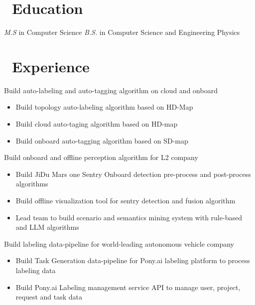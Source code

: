 \documentclass{resume}
\begin{document}



\section{\faGraduationCap\ Education}
\textit{M.S} in Computer Science
\textit{B.S.} in Computer Science and Engineering Physics

\section{\faUsers\ Experience}
Build auto-labeling and auto-tagging algorithm on cloud and onboard
\begin{itemize}
  \item Build topology auto-labeling algorithm based on HD-Map
  \item Build cloud auto-taging algorithm based on HD-map
  \item Build onboard auto-tagging algorithm based on SD-map
\end{itemize}

Build onboard and offline perception algorithm for L2 company
\begin{itemize}
  \item Build JiDu Mars one Sentry Onboard detection pre-process and post-process algorithms
  \item Build offline visualization tool for sentry detection and fusion algorithm
  \item Lead team to build scenario and semantics mining system with rule-based and LLM algorithms
\end{itemize}

Build labeling data-pipeline for world-leading autonomous vehicle company
\begin{itemize}
  \item Build Task Generation data-pipeline for Pony.ai labeling platform to process labeling data
  \item Build Pony.ai Labeling management service API to manage user, project, request and task data
\end{itemize}
\end{document}
